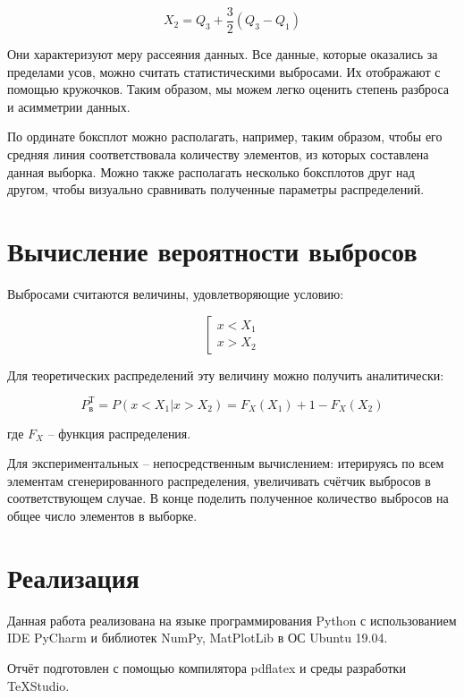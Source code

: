 \begin{equation}
	X_2 = Q_3 + \frac{3}{2}(Q_3-Q_1)
\end{equation}

Они характеризуют меру рассеяния данных. Все данные, которые оказались за пределами усов, можно считать статистическими выбросами. Их отображают с помощью кружочков. Таким образом, мы можем легко оценить степень разброса и асимметрии данных.

По ординате боксплот можно располагать, например, таким образом, чтобы его средняя линия соответствовала количеству элементов, из которых составлена данная выборка. Можно также располагать несколько боксплотов друг над другом, чтобы визуально сравнивать полученные параметры распределений.

\section{Вычисление вероятности выбросов}

Выбросами считаются величины, удовлетворяющие условию:


\begin{equation}
\left[
\begin{array}{c}
x < X_1 \\
x > X_2
\end{array}
\right.
\end{equation}

Для теоретических распределений эту величину можно получить аналитически:

\begin{equation}\label{trashdata}
P_{\text{в}}^{\text{Т}}=P(x<X_1 | x > X_2) = F_X(X_1) + 1 - F_X(X_2)
\end{equation}

где $F_X$ -- функция распределения.

Для экспериментальных -- непосредственным вычислением: итерируясь по всем элементам сгенерированного распределения, увеличивать счётчик выбросов в соответствующем случае. В конце поделить полученное количество выбросов на общее число элементов в выборке.
	
\section{Реализация}
Данная работа реализована на языке программирования Python с использованием IDE PyCharm и библиотек NumPy, MatPlotLib в ОС Ubuntu 19.04.

Отчёт подготовлен с помощью компилятора pdflatex и среды разработки TeXStudio.

